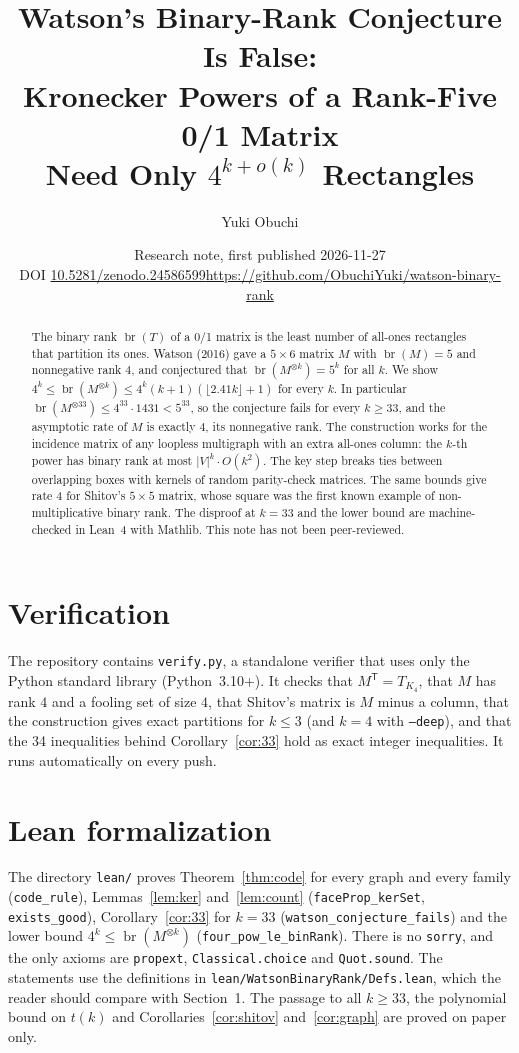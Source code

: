 \documentclass[11pt,a4paper]{article}
\title{Watson's Binary-Rank Conjecture Is False:\\ Kronecker Powers of a Rank-Five 0/1 Matrix\\ Need Only $4^{k+o(k)}$ Rectangles}
\author{Yuki Obuchi}
\date{Research note, first published 2026-11-27\\ \small DOI \href{https://doi.org/10.5281/zenodo.24586599}{10.5281/zenodo.24586599}\quad \url{https://github.com/ObuchiYuki/watson-binary-rank}}
\DeclareMathOperator{\br}{br}
\theoremstyle{remark}
\begin{document}
\maketitle
\begin{abstract}
The binary rank $\br(T)$ of a 0/1 matrix is the least number of all-ones rectangles that partition its ones. Watson (2016) gave a $5\times 6$ matrix $M$ with $\br(M)=5$ and nonnegative rank $4$, and conjectured that $\br(M^{\otimes k})=5^k$ for all $k$. We show $4^k\le\br(M^{\otimes k})\le 4^k(k+1)(\lfloor 2.41k\rfloor+1)$ for every $k$. In particular $\br(M^{\otimes 33})\le 4^{33}\cdot 1431<5^{33}$, so the conjecture fails for every $k\ge 33$, and the asymptotic rate of $M$ is exactly $4$, its nonnegative rank. The construction works for the incidence matrix of any loopless multigraph with an extra all-ones column: the $k$-th power has binary rank at most $|V|^k\cdot O(k^2)$. The key step breaks ties between overlapping boxes with kernels of random parity-check matrices. The same bounds give rate $4$ for Shitov's $5\times5$ matrix, whose square was the first known example of non-multiplicative binary rank. The disproof at $k=33$ and the lower bound are machine-checked in Lean~4 with Mathlib. This note has not been peer-reviewed.
\end{abstract}



\section*{Verification}
The repository contains \texttt{verify.py}, a standalone verifier that uses only the Python standard library (Python~3.10+). It checks that $M^{\mathsf T}=T_{K_4}$, that $M$ has rank $4$ and a fooling set of size $4$, that Shitov's matrix is $M$ minus a column, that the construction gives exact partitions for $k\le 3$ (and $k=4$ with \texttt{--deep}), and that the 34 inequalities behind Corollary~\ref{cor:33} hold as exact integer inequalities. It runs automatically on every push.

\section*{Lean formalization}
The directory \texttt{lean/} proves Theorem~\ref{thm:code} for every graph and every family (\texttt{code\_rule}), Lemmas~\ref{lem:ker} and~\ref{lem:count} (\texttt{faceProp\_kerSet}, \texttt{exists\_good}), Corollary~\ref{cor:33} for $k=33$ (\texttt{watson\_conjecture\_fails}) and the lower bound $4^k\le\br(M^{\otimes k})$ (\texttt{four\_pow\_le\_binRank}). There is no \texttt{sorry}, and the only axioms are \texttt{propext}, \texttt{Classical.choice} and \texttt{Quot.sound}. The statements use the definitions in \texttt{lean/WatsonBinaryRank/Defs.lean}, which the reader should compare with Section~1. The passage to all $k\ge 33$, the polynomial bound on $t(k)$ and Corollaries~\ref{cor:shitov} and~\ref{cor:graph} are proved on paper only.
\end{document}
